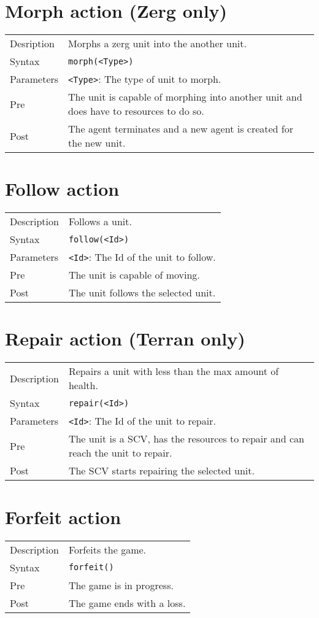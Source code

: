 \section{Morph action (Zerg only)}
\begin{tabularx}{\textwidth}{lX}
 Desription & Morphs a zerg unit into the another unit. \\
 Syntax & \verb|morph(<Type>)| \\
 Parameters & \verb|<Type>|: The type of unit to morph.\\
 Pre & The unit is capable of morphing into another unit and does have to resources to do so. \\
 Post & The agent terminates and a new agent is created for the new unit.
\end{tabularx}

\section{Follow action}
\begin{tabularx}{\textwidth}{lX}
 Description & Follows a unit. \\
 Syntax & \verb|follow(<Id>)| \\
 Parameters & \verb|<Id>|: The Id of the unit to follow. \\
 Pre & The unit is capable of moving. \\
 Post & The unit follows the selected unit.
\end{tabularx}

\section{Repair action (Terran only)}
\begin{tabularx}{\textwidth}{lX}
 Description & Repairs a unit with less than the max amount of health. \\
 Syntax & \verb|repair(<Id>)| \\
 Parameters & \verb|<Id>|: The Id of the unit to repair. \\
 Pre & The unit is a SCV, has the resources to repair and can reach the unit to repair. \\
 Post & The SCV starts repairing the selected unit.
\end{tabularx}

\section{Forfeit action}
\begin{tabularx}{\textwidth}{lX}
 Description & Forfeits the game. \\
 Syntax & \verb|forfeit()| \\
 Pre & The game is in progress. \\
 Post & The game ends with a loss.
\end{tabularx}


